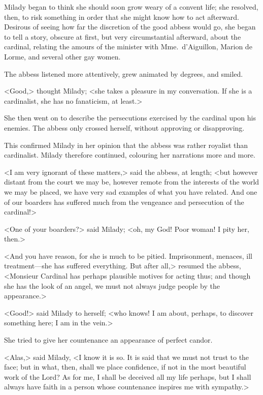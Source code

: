 Milady began to think she should soon grow weary of a convent life; she resolved, then, to risk something in order that she might know how to act afterward. Desirous of seeing how far the discretion of the good abbess would go, she began to tell a story, obscure at first, but very circumstantial afterward, about the cardinal, relating the amours of the minister with Mme.~d'Aiguillon, Marion de Lorme, and several other gay women. 

The abbess listened more attentively, grew animated by degrees, and smiled. 

<Good,> thought Milady; <she takes a pleasure in my conversation. If she is a cardinalist, she has no fanaticism, at least.> 

She then went on to describe the persecutions exercised by the cardinal upon his enemies. The abbess only crossed herself, without approving or disapproving. 

This confirmed Milady in her opinion that the abbess was rather royalist than cardinalist. Milady therefore continued, colouring her narrations more and more. 

<I am very ignorant of these matters,> said the abbess, at length; <but however distant from the court we may be, however remote from the interests of the world we may be placed, we have very sad examples of what you have related. And one of our boarders has suffered much from the vengeance and persecution of the cardinal!> 

<One of your boarders?> said Milady; <oh, my God! Poor woman! I pity her, then.> 

<And you have reason, for she is much to be pitied. Imprisonment, menaces, ill treatment—she has suffered everything. But after all,> resumed the abbess, <Monsieur Cardinal has perhaps plausible motives for acting thus; and though she has the look of an angel, we must not always judge people by the appearance.> 

<Good!> said Milady to herself; <who knows! I am about, perhaps, to discover something here; I am in the vein.> 

She tried to give her countenance an appearance of perfect candor. 

<Alas,> said Milady, <I know it is so. It is said that we must not trust to the face; but in what, then, shall we place confidence, if not in the most beautiful work of the Lord? As for me, I shall be deceived all my life perhaps, but I shall always have faith in a person whose countenance inspires me with sympathy.> 

